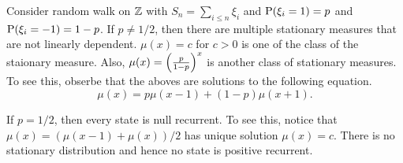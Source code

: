 \begin{example}
    Consider random walk on $\Z$ with $S_n = \sum_{i\leq n} \xi_i$ and 
    $\P(\xi_i = 1) = p$ and $\P(\xi_i = -1) = 1-p$. If $p\neq 1/2$, then 
    there are multiple stationary measures that are not linearly dependent. 
    $\mu(x) = c$ for $c>0$ is one of the class of the staionary measure. 
    Also, $\mu(x) = \pth{\frac{p}{1-p}}^x$ is another class of stationary 
    measures. To see this, obserbe that the aboves are solutions to the 
    following equation. 
    \begin{equation*}
        \mu(x) = p\mu(x-1) + (1-p)\mu(x+1).
    \end{equation*}

    If $p = 1/2$, then every state is null recurrent. To see this, notice 
    that $\mu(x) = (\mu(x-1) + \mu(x))/2$ has unique solution $\mu(x) = c$. 
    There is no stationary distribution and hence no state is positive 
    recurrent. 
\end{example}

